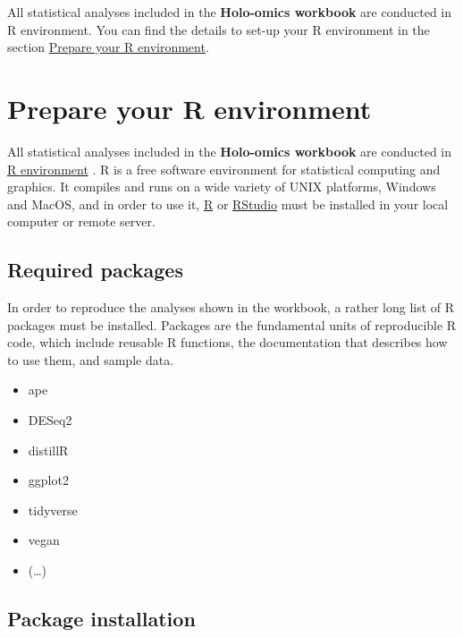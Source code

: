 \documentclass[
]{book}
\providecommand{\tightlist}{%
  \setlength{\itemsep}{0pt}\setlength{\parskip}{0pt}}
\begin{document}
All statistical analyses included in the \textbf{Holo-omics workbook} are conducted in R environment. You can find the details to set-up your R environment in the section \protect\hyperlink{prepare-r}{Prepare your R environment}.

\hypertarget{prepare-r}{%
\section{Prepare your R environment}\label{prepare-r}}

All statistical analyses included in the \textbf{Holo-omics workbook} are conducted in \href{https://en.wikipedia.org/wiki/R_(programming_language)}{R environment} \citep{R_Development_Core_Team2008-gd}. R is a free software environment for statistical computing and graphics. It compiles and runs on a wide variety of UNIX platforms, Windows and MacOS, and in order to use it, \href{https://cran.r-project.org/}{R} or \href{https://posit.co/downloads/}{RStudio} must be installed in your local computer or remote server.

\hypertarget{required-packages}{%
\subsection*{Required packages}\label{required-packages}}

In order to reproduce the analyses shown in the workbook, a rather long list of R packages must be installed. Packages are the fundamental units of reproducible R code, which include reusable R functions, the documentation that describes how to use them, and sample data.

\begin{itemize}
\tightlist
\item
  ape
\item
  DESeq2
\item
  distillR
\item
  ggplot2
\item
  tidyverse
\item
  vegan
\item
  (\ldots)
\end{itemize}

\hypertarget{package-installation}{%
\subsection*{Package installation}\label{package-installation}}
\end{document}
